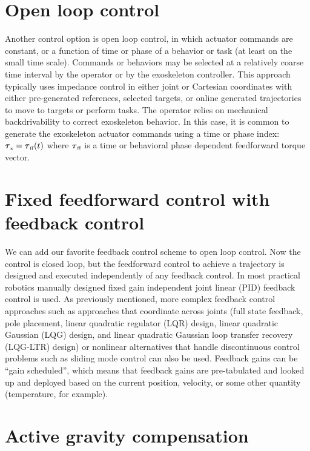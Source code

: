 \documentclass[letterpaper,12pt,fullpage]{article}
\newcommand{\ff}{{\mbox {\tiny ff}}}
\newcommand{\myx}{{\mbox {\tiny x}}}
\begin{document}
\section{Open loop control}

Another control option is open loop control, in which actuator commands are
constant, or a function of time or phase of a behavior or task
(at least on the small time scale).
Commands or behaviors may be selected at a relatively coarse time interval
by the operator or by the exoskeleton controller.
This approach typically 
uses impedance control in either joint or
Cartesian coordinates
with either pre-generated references, selected targets,
or online generated trajectories to move to targets or perform tasks.
The operator relies on mechanical backdrivability 
to correct exoskeleton behavior.
In this case, it is common to generate the exoskeleton actuator commands using
a time or phase index:
$\vtau_{\myx} = \vtau_{\ff}(t)$ where $\vtau_{\ff}$ is a time or behavioral phase
dependent feedforward torque vector.

\section{Fixed feedforward control with feedback control}

We can add our favorite feedback control scheme to open loop control.
Now the control is closed loop, but the feedforward control to achieve
a trajectory is designed and executed independently of any feedback control.
In most practical robotics manually designed
fixed gain independent joint linear (PID) feedback control is used.
As previously mentioned, more complex feedback control approaches such as
approaches that coordinate across joints
(full state feedback,
pole placement, linear quadratic regulator (LQR) design, linear quadratic
Gaussian (LQG) design, and linear quadratic Gaussian loop transfer recovery
(LQG-LTR) design)
or nonlinear alternatives that handle discontinuous control problems such as
sliding mode control can also be used.
Feedback gains can be ``gain scheduled'', which means that feedback gains are
pre-tabulated and looked up and deployed
based on the current position, velocity, or some other
quantity (temperature, for example). 

\section{Active gravity compensation}
\end{document}
